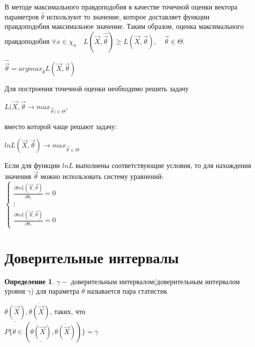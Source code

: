 \documentclass[a4paper, 12pt]{article}
\theoremstyle{definition}
\newtheorem{definition}{Определение}[section]
\theoremstyle{leads}
\theoremstyle{example}
\begin{document}
В методе максимального правдоподобия в качестве точечной оценки вектора параметров $\hat{\theta}$ используют то значение, которое доставляет функции правдоподобия максимальное значение. Таким образом, оценка максимального правдоподобия $\forall x \in \chi_n \quad L(\vec{X}, \hat{\vec{\theta}}) \geq L(\vec{X}, \vec{\theta}), \quad \vec{\theta} \in \Theta$.\\
\begin{center}
	\centering
	$\hat{\vec{\theta}} = arg max_{\hat{\theta}} L(\vec{X}, \vec{\theta})$
\end{center}  

Для построения точечной оценки необходимо решить задачу 
\begin{center}
	\centering
	$L(\vec{X}, \vec{\theta} \longrightarrow max_{\vec{\theta}) \in \Theta}$,
\end{center}
вместо которой чаще решают задачу:
\begin{center}
	\centering
	$ln L(\vec{X}, \vec{\theta}) \longrightarrow max_{\vec{\theta} \in \Theta}$
\end{center}
Если для функции $ln L$ выполнены соответствующие условия, то для нахождения значения $\vec{\theta}$ можно использовать систему уравнений:\\
$\left \{
\begin{array}{ccc}
\frac{\partial ln L(\vec{X}, \vec{\theta})}{\partial \theta_1} = 0\\
\vdots\\
\frac{\partial ln L(\vec{X}, \vec{\theta})}{\partial \theta_r} = 0
\end{array}
\right.$

\section{Доверительные интервалы}
\begin{definition}
	$\gamma - $ доверительным интервалом(доверительным интервалом уровня $\gamma$) для параметра $\theta$ называется пара статистик\\
	\begin{center}
		\centering
		$\underline{\theta(\vec{X})}, \overline{\theta(\vec{X})}$, таких, что
		\\$P\{\theta \in (\underline{\theta(\vec{X})}, \overline{\theta(\vec{X})})\} = \gamma $	
	\end{center}
\end{definition}	
\end{document}
